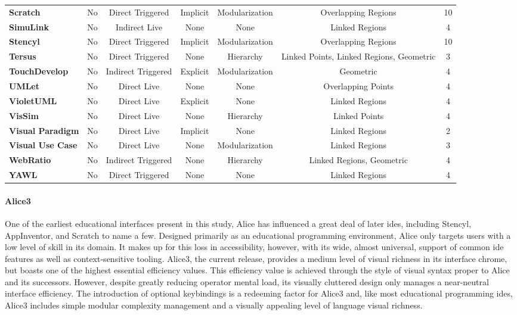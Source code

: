 \begin{table*}
{\begin{tabular}{l|ccc|ccc}
      \textbf{Scratch}    & No	& Direct Triggered	& Implicit	& Modularization	& Overlapping Regions	& 10			\\[1ex]
      \textbf{SimuLink}    & No	& Indirect Live	& None	& None	& Linked Regions	& 4			\\[1ex]
      \textbf{Stencyl}    & No	& Direct Triggered	& Implicit	& Modularization	& Overlapping Regions	& 10			\\[1ex]
      \textbf{Tersus}    & No	& Direct Triggered	& None	& Hierarchy	& Linked Points, Linked Regions, Geometric	& 3			\\[1ex]
      \textbf{TouchDevelop}    & No	& Indirect Triggered	& Explicit	& Modularization	& Geometric	& 4			\\[1ex]
      \textbf{UMLet}    & No	& Direct Live	& None	& None	& Overlapping Points	& 4			\\[1ex]
      \textbf{VioletUML}    & No	& Direct Live	& Explicit	& None	& Linked Regions	& 4			\\[1ex]
      \textbf{VisSim}    & No	& Direct Live	& None	& Hierarchy	& Linked Points	& 4			\\[1ex]
      \textbf{Visual Paradigm}    & No	& Direct Live	& Implicit	& None	& Linked Regions	& 2			\\[1ex]
      \textbf{Visual Use Case}    & No	& Direct Live	& None	& Modularization	& Linked Regions	& 3			\\[1ex]
      \textbf{WebRatio}    & No	& Indirect Triggered	& None	& Hierarchy	& Linked Regions, Geometric	& 4			\\[1ex]
      \textbf{YAWL}    & No	& Direct Triggered	& None	& None	& Linked Regions	& 4			\\[1ex]
		\end{tabular}}
	\caption{Measure of the integration and language syntax of \acp{ide}.}
	\label{tab:integration-langsyn}
\end{table*}
%
\paragraph{Alice3} One of the earliest educational interfaces present in
this study, Alice has influenced a great deal of later \acp{ide},
including Stencyl, AppInventor, and Scratch to name a few.
Designed primarily as an educational programming
environment, Alice only targets users with a low level of
skill in its domain. It makes up for this loss in accessibility, however,
with its wide, almost universal, support of common \ac{ide} features as
well as context-sensitive tooling. Alice3, the current release, provides a medium level of visual
richness in its interface chrome, but boasts one of the highest essential
efficiency values. This efficiency value is achieved through the style of visual syntax proper to Alice and its successors.
However, despite greatly reducing
operator mental load, its visually cluttered design only manages a
near-neutral interface efficiency. The introduction of optional keybindings
is a redeeming factor for Alice3 and, like most educational programming
\acp{ide}, Alice3 includes simple modular complexity management and a
visually appealing level of language visual richness.

